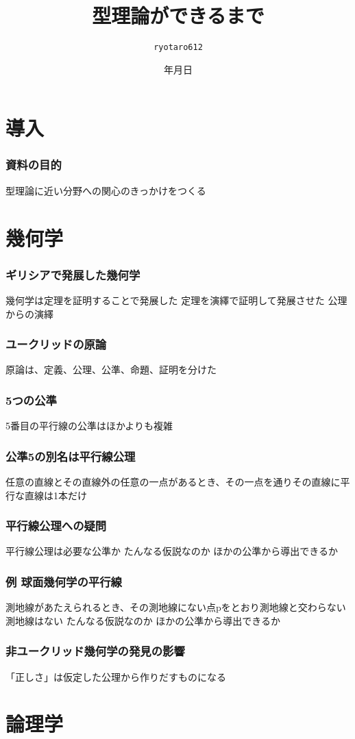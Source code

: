 \documentclass[unicode, 14pt, aspectratio=169]{beamer}
\date{\number\year 年\number\month 月\number\day 日}
\title{型理論ができるまで}
\author{\texttt{ryotaro612}}
\begin{document}
\begin{frame}
\titlepage
\end{frame}
\section{導入}
\begin{frame}
  \frametitle{資料の目的}
  {\large 型理論に近い分野への関心のきっかけをつくる}
\end{frame}
\section{幾何学}
\begin{frame}
  \frametitle{ギリシアで発展した幾何学}
  {\large 幾何学は定理を証明することで発展した}
  定理を演繹で証明して発展させた
  公理からの演繹
\end{frame}
\begin{frame}
  \frametitle{ユークリッドの原論}
  {\large 原論は、定義、公理、公準、命題、証明を分けた}
\end{frame}
\begin{frame}
  \frametitle{5つの公準}
  {\large 5番目の平行線の公準はほかよりも複雑}
\end{frame}
\begin{frame}
  \frametitle{公準5の別名は平行線公理}
  {\large 任意の直線とその直線外の任意の一点があるとき、その一点を通りその直線に平行な直線は1本だけ}
\end{frame}
\begin{frame}
  \frametitle{平行線公理への疑問}
  {\large 平行線公理は必要な公準か}
  たんなる仮説なのか
  ほかの公準から導出できるか
\end{frame}
\begin{frame}
  \frametitle{例 球面幾何学の平行線}
  {\large 測地線があたえられるとき、その測地線にない点pをとおり測地線と交わらない測地線はない}
  たんなる仮説なのか
  ほかの公準から導出できるか
\end{frame}
\begin{frame}
  \frametitle{非ユークリッド幾何学の発見の影響}
  「正しさ」は仮定した公理から作りだすものになる
\end{frame}
\section{論理学}
\end{document}
